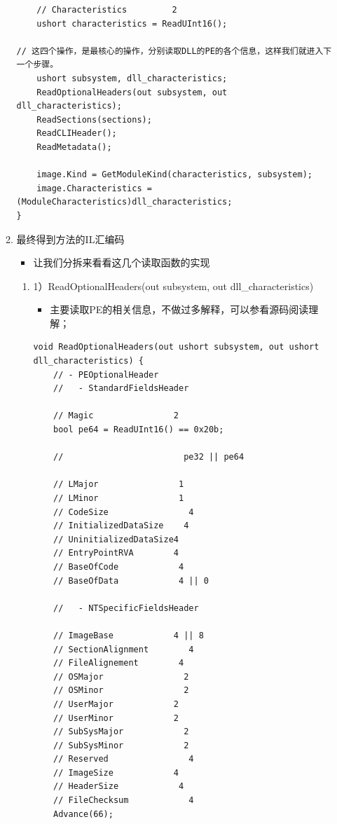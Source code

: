 \documentclass[9pt, b5paper]{article}
\begin{document}
\begin{enumerate}
\begin{enumerate}
\begin{verbatim}
    // Characteristics         2
    ushort characteristics = ReadUInt16();

// 这四个操作，是最核心的操作，分别读取DLL的PE的各个信息，这样我们就进入下一个步骤。
    ushort subsystem, dll_characteristics;
    ReadOptionalHeaders(out subsystem, out dll_characteristics);
    ReadSections(sections);
    ReadCLIHeader();
    ReadMetadata();

    image.Kind = GetModuleKind(characteristics, subsystem);
    image.Characteristics = (ModuleCharacteristics)dll_characteristics;
}
\end{verbatim}
\item 最终得到方法的IL汇编码
\label{sec-9-1-3-1-3}
\begin{itemize}
\item 让我们分拆来看看这几个读取函数的实现
\end{itemize}
\begin{enumerate}
\item 1）ReadOptionalHeaders(out subsystem, out dll\_characteristics)
\label{sec-9-1-3-1-3-1}
\begin{itemize}
\item 主要读取PE的相关信息，不做过多解释，可以参看源码阅读理解；
\end{itemize}
\begin{verbatim}
void ReadOptionalHeaders(out ushort subsystem, out ushort dll_characteristics) {
    // - PEOptionalHeader
    //   - StandardFieldsHeader

    // Magic                2
    bool pe64 = ReadUInt16() == 0x20b;

    //                        pe32 || pe64

    // LMajor                1
    // LMinor                1
    // CodeSize                4
    // InitializedDataSize    4
    // UninitializedDataSize4
    // EntryPointRVA        4
    // BaseOfCode            4
    // BaseOfData            4 || 0

    //   - NTSpecificFieldsHeader

    // ImageBase            4 || 8
    // SectionAlignment        4
    // FileAlignement        4
    // OSMajor                2
    // OSMinor                2
    // UserMajor            2
    // UserMinor            2
    // SubSysMajor            2
    // SubSysMinor            2
    // Reserved                4
    // ImageSize            4
    // HeaderSize            4
    // FileChecksum            4
    Advance(66);


\end{verbatim}
\end{enumerate}
\end{enumerate}
\end{enumerate}
\end{document}
